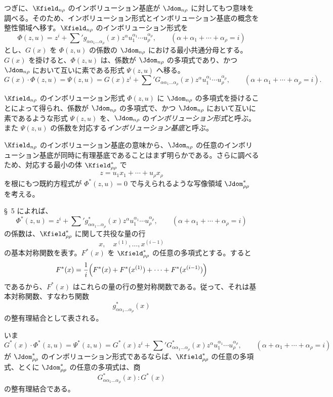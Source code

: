 \documentclass[11pt]{article}
\begin{document}
つぎに、$\Kfield_{n\rho}$ のインボリューション基底が $\Jdom_{n\rho}$ に対してもつ意味を調べる。そのため、インボリューション形式とインボリューション基底の概念を整性領域へ移す。$\Kfield_{n\rho}$ のインボリューション形式を
\[
  \Phi(z,u)=z^i+\sum{}' g_{\alpha\alpha_1\ldots\alpha_\rho}(x)
  z^\alpha u_1^{\alpha_1}\cdots u_\rho^{\alpha_\rho},
  \qquad
  (\alpha+\alpha_1+\cdots+\alpha_\rho=i)
\]
とし、$G(x)$ を $\Phi(z,u)$ の係数の $\Jdom_{n\rho}$ における最小共通分母とする。$G(x)$ を掛けると、$\Phi(z,u)$ は、係数が $\Jdom_{n\rho}$ の多項式であり、かつ $\Jdom_{n\rho}$ において互いに素である形式 $\Psi(z,u)$ へ移る。
\[
  G(x)\cdot\Phi(z,u)=\Psi(z,u)
  =G(x)z^i+
  \sum{}' G_{\alpha\alpha_1\ldots\alpha_\rho}(x)
  z^\alpha u_1^{\alpha_1}\cdots u_\rho^{\alpha_\rho},
  \qquad
  (\alpha+\alpha_1+\cdots+\alpha_\rho=i).
\]

$\Kfield_{n\rho}$ のインボリューション形式 $\Phi(z,u)$ に $\Jdom_{n\rho}$ の多項式を掛けることによって得られ、係数が $\Jdom_{n\rho}$ の多項式で、かつ $\Jdom_{n\rho}$ において互いに素であるような形式 $\Psi(z,u)$ を、$\Jdom_{n\rho}$ の\emph{インボリューション形式}と呼ぶ。また $\Psi(z,u)$ の係数を対応する\emph{インボリューション基底}と呼ぶ。

$\Kfield_{n\rho}$ のインボリューション基底の意味から、$\Jdom_{n\rho}$ の任意のインボリューション基底が同時に有理基底であることはまず明らかである。さらに調べるため、対応する最小の体 $\Kfield^*_{\rho\rho}$ で
\[
  z=u_1x_1+\cdots+u_\rho x_\rho
\]
を根にもつ既約方程式が $\Phi^*(z,u)=0$ で与えられるような写像領域 $\Jdom^*_{\rho\rho}$ を考える。

\S\ 5 によれば、
\[
  \Phi^*(z,u)=z^i+\sum{}' g^*_{\alpha\alpha_1\ldots\alpha_\rho}(x)
  z^\alpha u_1^{\alpha_1}\cdots u_\rho^{\alpha_\rho},
  \qquad
  (\alpha+\alpha_1+\cdots+\alpha_\rho=i)
\]
の係数は、$\Kfield^*_{\rho\rho}$ に関して共役な量の行
\[
  x,\quad x^{(1)},\ldots,x^{(i-1)}
\]
の基本対称関数を表す。$F^*(x)$ を $\Kfield^*_{\rho\rho}$ の任意の多項式とする。すると
\[
  F^*(x)=\frac1i\Bigl(F^*(x)+F^*(x^{(1)})+
  \cdots+F^*(x^{(i-1)})\Bigr)
\]
であるから、$F^*(x)$ はこれらの量の行の整対称関数である。従って、それは基本対称関数、すなわち関数
\[
  g^*_{\alpha\alpha_1\ldots\alpha_\rho}(x)
\]
の整有理結合として表される。

いま
\[
  G^*(x)\cdot\Phi^*(z,u)=\Psi^*(z,u)
  =G^*(x)z^i+
  \sum{}'G^*_{\alpha\alpha_1\ldots\alpha_\rho}(x)
  z^\alpha u_1^{\alpha_1}\cdots u_\rho^{\alpha_\rho},
  \qquad
  (\alpha+\alpha_1+\cdots+\alpha_\rho=i)
\]
が $\Jdom^*_{\rho\rho}$ のインボリューション形式であるならば、$\Kfield^*_{\rho\rho}$ の任意の多項式、とくに $\Jdom^*_{\rho\rho}$ の任意の多項式は、商
\[
  G^*_{\alpha\alpha_1\ldots\alpha_\rho}(x):G^*(x)
\]
の整有理結合である。
\end{document}
